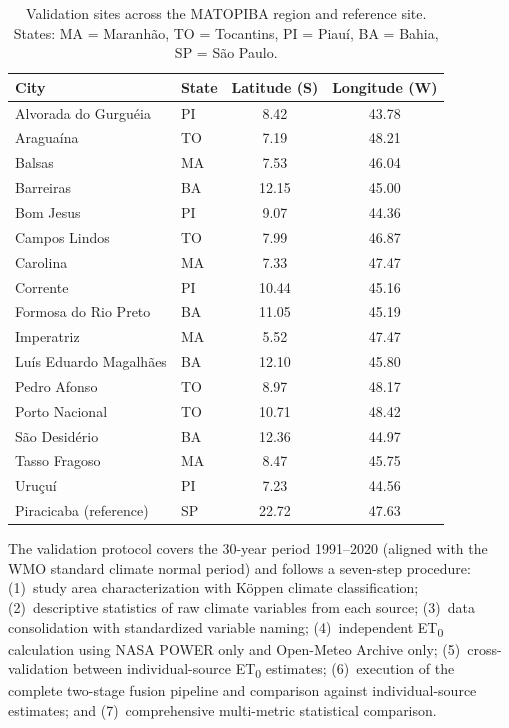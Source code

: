 \documentclass[preprint,review,12pt]{elsarticle}
\begin{document}
\begin{table}[htbp]
\centering
\caption{Validation sites across the MATOPIBA region and reference site.
States: MA = Maranh\~ao, TO = Tocantins, PI = Piau\'i, BA = Bahia,
SP = S\~ao Paulo.}
\label{tab:sites}
\small
\begin{tabular}{@{}llcc@{}}
\toprule
City & State & Latitude (\textdegree{}S) & Longitude (\textdegree{}W) \\
\midrule
Alvorada do Gurgu\'eia & PI & 8.42 & 43.78 \\
Aragua\'ina & TO & 7.19 & 48.21 \\
Balsas & MA & 7.53 & 46.04 \\
Barreiras & BA & 12.15 & 45.00 \\
Bom Jesus & PI & 9.07 & 44.36 \\
Campos Lindos & TO & 7.99 & 46.87 \\
Carolina & MA & 7.33 & 47.47 \\
Corrente & PI & 10.44 & 45.16 \\
Formosa do Rio Preto & BA & 11.05 & 45.19 \\
Imperatriz & MA & 5.52 & 47.47 \\
Lu\'is Eduardo Magalh\~aes & BA & 12.10 & 45.80 \\
Pedro Afonso & TO & 8.97 & 48.17 \\
Porto Nacional & TO & 10.71 & 48.42 \\
S\~ao Desid\'erio & BA & 12.36 & 44.97 \\
Tasso Fragoso & MA & 8.47 & 45.75 \\
Uru\c{c}u\'i & PI & 7.23 & 44.56 \\
\midrule
Piracicaba (reference) & SP & 22.72 & 47.63 \\
\bottomrule
\end{tabular}
\end{table}

The validation protocol covers the 30-year period 1991--2020 (aligned with the
WMO standard climate normal period) and follows a seven-step procedure:
(1)~study area characterization with K\"oppen climate classification;
(2)~descriptive statistics of raw climate variables from each source;
(3)~data consolidation with standardized variable naming;
(4)~independent ET\textsubscript{0} calculation using NASA POWER only and
Open-Meteo Archive only;
(5)~cross-validation between individual-source ET\textsubscript{0} estimates;
(6)~execution of the complete two-stage fusion pipeline and comparison against
individual-source estimates; and
(7)~comprehensive multi-metric statistical comparison.
\end{document}
